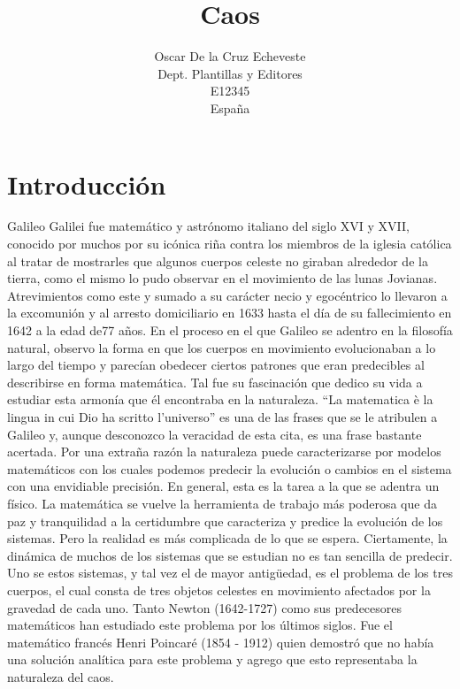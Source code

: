 \documentclass[11pt,twocolumn,spanish]{article}
\title{Caos}
\author{Oscar De la Cruz Echeveste\\
  \small Dept. Plantillas y Editores\\
  \small E12345\\
  \small España
}
\theoremstyle{definition}
\theoremstyle{remark}
\begin{document}
\maketitle


\section{Introducción}
Galileo Galilei fue matemático y astrónomo italiano del siglo XVI y XVII, conocido por muchos por su icónica riña contra los miembros de la iglesia católica al tratar de mostrarles que algunos cuerpos celeste no giraban alrededor de la tierra, como el mismo lo pudo observar en el movimiento de las lunas Jovianas. Atrevimientos como este y sumado a su carácter necio y egocéntrico lo llevaron a la excomunión y al arresto domiciliario en 1633 hasta el día de su fallecimiento en 1642 a la edad de77 años. En el proceso en el que Galileo se adentro en la filosofía natural, observo la forma en que los cuerpos en movimiento evolucionaban a lo largo del tiempo y parecían obedecer ciertos patrones que eran predecibles al describirse en forma matemática. Tal fue su fascinación que dedico su vida a estudiar esta armonía que él encontraba en la naturaleza. “La matematica è la lingua in cui Dio ha scritto l'universo” es una de las frases que se le atribulen a Galileo y, aunque desconozco la veracidad de esta cita, es una frase bastante acertada. Por una extraña razón la naturaleza puede caracterizarse por modelos matemáticos con los cuales podemos predecir la evolución o cambios en el sistema con una envidiable precisión. En general, esta es la tarea a la que se adentra un físico. La matemática se vuelve la herramienta de trabajo más poderosa que da paz y tranquilidad a la certidumbre que caracteriza y predice la evolución de los sistemas. Pero la realidad es más complicada de lo que se espera. Ciertamente, la dinámica de muchos de los sistemas que se estudian no es tan sencilla de predecir. Uno se estos sistemas, y tal vez el de mayor antigüedad, es el problema de los tres cuerpos, el cual consta de tres objetos celestes en movimiento afectados por la gravedad de cada uno. Tanto Newton (1642-1727) como sus predecesores matemáticos han estudiado este problema por los últimos siglos. Fue el matemático francés Henri Poincaré (1854 - 1912) quien demostró que no había una solución analítica para este problema y agrego que esto representaba la naturaleza del caos. 
\end{document}
